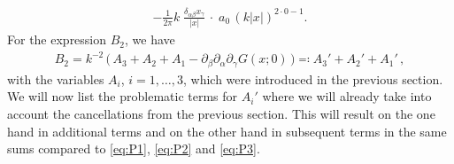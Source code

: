 \begin{align}
  \label{eq:Q1}
  \tag{Q1}
  -\frac{1}{2\pi} k\;  \frac{\delta_{\alpha\beta} x_\gamma}{|x|}\, \cdot \; a_0 \, (k|x|)^{2 \cdot 0 - 1} .
\end{align}
For the expression $B_2$, we have  
\begin{align*}
  B_2 = k^{-2} \, \Big( \, A_3 + A_2 + A_1 - \partial_\beta\partial_\alpha\partial_\gamma G(x; 0)\, \Big) \eqqcolon A_3' + A_2' + A_1'\,,
\end{align*}
with the variables $A_i$, $i = 1, \dots, 3$, which were introduced in the previous section. 
We will now list the problematic terms for $A_i'$ where we will already take into account the cancellations from the previous section.
This will result on the one hand in additional terms and on the other hand in subsequent terms in the same sums compared to \eqref{eq:P1}, \eqref{eq:P2} and \eqref{eq:P3}.

